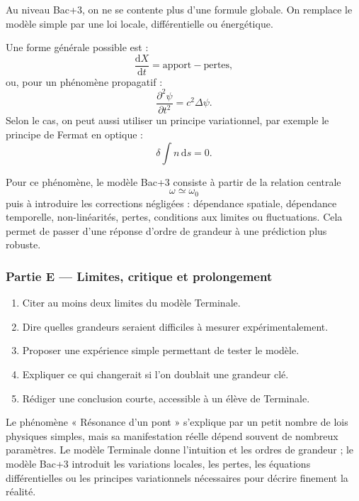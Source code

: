 \documentclass[11pt,a4paper]{article}
\begin{document}
\begin{approfondissementbox}
Au niveau Bac+3, on ne se contente plus d'une formule globale. On remplace le modèle simple par une loi locale, différentielle ou énergétique.

Une forme générale possible est :
\[
\frac{\mathrm d X}{\mathrm dt}=\text{apport}-\text{pertes},
\]
ou, pour un phénomène propagatif :
\[
\frac{\partial^2 \psi}{\partial t^2}=c^2\Delta\psi.
\]
Selon le cas, on peut aussi utiliser un principe variationnel, par exemple le principe de Fermat en optique :
\[
\delta \int n\,\mathrm ds=0.
\]

Pour ce phénomène, le modèle Bac+3 consiste à partir de la relation centrale
\[
\omega\simeq\omega_0
\]
puis à introduire les corrections négligées : dépendance spatiale, dépendance temporelle, non-linéarités, pertes, conditions aux limites ou fluctuations. Cela permet de passer d'une réponse d'ordre de grandeur à une prédiction plus robuste.
\end{approfondissementbox}

\subsubsection*{Partie E — Limites, critique et prolongement}

\begin{enumerate}
  \item Citer au moins deux limites du modèle Terminale.
  \item Dire quelles grandeurs seraient difficiles à mesurer expérimentalement.
  \item Proposer une expérience simple permettant de tester le modèle.
  \item Expliquer ce qui changerait si l'on doublait une grandeur clé.
  \item Rédiger une conclusion courte, accessible à un élève de Terminale.
\end{enumerate}

\begin{corrigebox}
Le phénomène « Résonance d'un pont » s'explique par un petit nombre de lois physiques simples, mais sa manifestation réelle dépend souvent de nombreux paramètres. Le modèle Terminale donne l'intuition et les ordres de grandeur ; le modèle Bac+3 introduit les variations locales, les pertes, les équations différentielles ou les principes variationnels nécessaires pour décrire finement la réalité.
\end{corrigebox}
\end{document}
